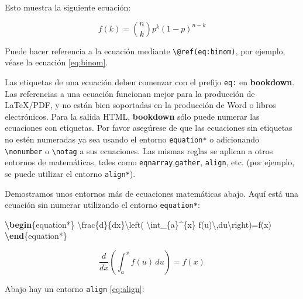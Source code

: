 \documentclass[12pt,]{krantz}
\makeatletter
\newenvironment{Shaded}{\begin{snugshade}}{\end{snugshade}}
\newcommand{\KeywordTok}[1]{\textcolor[rgb]{0.13,0.29,0.53}{\textbf{#1}}}
\newcommand{\SpecialCharTok}[1]{\textcolor[rgb]{0.00,0.00,0.00}{#1}}
\newcommand{\SpecialStringTok}[1]{\textcolor[rgb]{0.31,0.60,0.02}{#1}}
\newcommand{\ExtensionTok}[1]{#1}
\newcommand{\NormalTok}[1]{#1}
\newenvironment{kframe}{%
\medskip{}
\setlength{\fboxsep}{.8em}
 \def\at@end@of@kframe{}%
 \ifinner\ifhmode%
  \def\at@end@of@kframe{\end{minipage}}%
  \begin{minipage}{\columnwidth}%
 \fi\fi%
 \def\FrameCommand##1{\hskip\@totalleftmargin \hskip-\fboxsep
 \colorbox{shadecolor}{##1}\hskip-\fboxsep
     \hskip-\linewidth \hskip-\@totalleftmargin \hskip\columnwidth}%
 \MakeFramed {\advance\hsize-\width
   \@totalleftmargin\z@ \linewidth\hsize
   \@setminipage}}%
 {\par\unskip\endMakeFramed%
 \at@end@of@kframe}
\renewenvironment{Shaded}{\begin{kframe}}{\end{kframe}}
\theoremstyle{definition}
\theoremstyle{definition}
\theoremstyle{definition}
\theoremstyle{remark}
\let\BeginKnitrBlock\begin \let\EndKnitrBlock\end
\makeatother
\begin{document}
Esto muestra la siguiente ecuación:

\begin{equation}
f\left(k\right)=\binom{n}{k}p^k\left(1-p\right)^{n-k} \label{eq:binom}
\end{equation}

Puede hacer referencia a la ecuación mediante
\texttt{\textbackslash{}@ref(eq:binom)}, por ejemplo, véase la ecuación
\eqref{eq:binom}.

\BeginKnitrBlock{rmdcaution}
Las etiquetas de una ecuación deben comenzar con el prefijo \texttt{eq:}
en \textbf{bookdown}. Las referencias a una ecuación funcionan mejor
para la producción de LaTeX/PDF, y no están bien soportadas en la
producción de Word o libros electrónicos. Para la salida HTML,
\textbf{bookdown} sólo puede numerar las ecuaciones con etiquetas. Por
favor asegúrese de que las ecuaciones sin etiquetas no estén numeradas
ya sea usando el entorno \texttt{equation*} o adicionando
\texttt{\textbackslash{}nonumber} o \texttt{\textbackslash{}notag} a sus
ecuaciones. Las mismas reglas se aplican a otros entornos de
matemáticas, tales como \texttt{eqnarray},\texttt{gather},
\texttt{align}, etc. (por ejemplo, se puede utilizar el entorno
\texttt{align*}).
\EndKnitrBlock{rmdcaution}

Demostramos unos entornos más de ecuaciones matemáticas abajo. Aquí está
una ecuación sin numerar utilizando el entorno \texttt{equation*}:

\begin{Shaded}
\begin{Highlighting}[]
\KeywordTok{\textbackslash{}begin}\NormalTok{\{}\ExtensionTok{equation*}\NormalTok{\}}\SpecialStringTok{ }
\SpecialCharTok{\textbackslash{}frac}\SpecialStringTok{\{d\}\{dx\}}\SpecialCharTok{\textbackslash{}left}\SpecialStringTok{( }\SpecialCharTok{\textbackslash{}int}\SpecialStringTok{_\{a\}^\{x\} f(u)}\SpecialCharTok{\textbackslash{},}\SpecialStringTok{du}\SpecialCharTok{\textbackslash{}right}\SpecialStringTok{)=f(x)}
\KeywordTok{\textbackslash{}end}\NormalTok{\{}\ExtensionTok{equation*}\NormalTok{\} }
\end{Highlighting}
\end{Shaded}

\begin{equation*}
\frac{d}{dx}\left( \int_{a}^{x} f(u)\,du\right)=f(x)
\end{equation*}

Abajo hay un entorno \texttt{align} \eqref{eq:align}:
\end{document}
